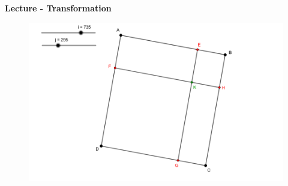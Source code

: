 \documentclass{beamer}
\begin{document}
\begin{frame}[t]
\begin{columns}[t]
\begin{column}{.49\linewidth}

                \begin{block}{\centering \textbf{Lecture - Transformation}}
                    \begin{figure}[t]
                        \includegraphics[width=.5\linewidth]{rsc/formule_transformation.png}\\
                    \end{figure}
                \end{block}

                \vspace{1cm}



\end{column}
\end{columns}
\end{frame}
\end{document}
